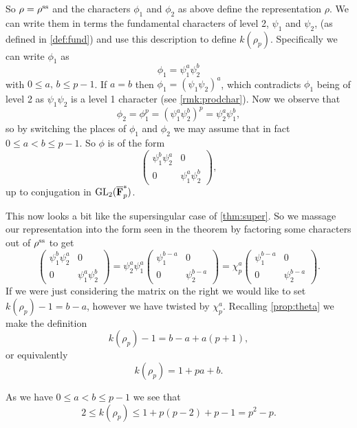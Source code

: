 \documentclass[a4paper,12pt]{article}
\begin{document}
So $\rho = \rho^\text{ss}$ and the characters $\phi_1$ and $\phi_2$ as above define the representation $\rho$.
We can write them in terms the fundamental characters of level 2, $\psi_1$ and $\psi_2$, (as defined in \cref{def:fund}) and use this description to define $k(\rho_p)$.
Specifically we can write $\phi_1$ as
\[
\phi_1 = \psi_1^a\psi_2^b
\]
with $0\le a,\,b\le p-1$.
If $a = b$ then $\phi_1 = (\psi_1 \psi_2)^a$, which contradicts $\phi_1$ being of level 2 as $\psi_1\psi_2$ is a level 1 character (see \cref{rmk:prodchar}).
Now we observe that
\[
\phi_2 = \phi_1^p = (\psi_1^a\psi_2^b)^p = \psi_2^a\psi_1^b,
\]
so by switching the places of $\phi_1$ and $\phi_2$ we may assume that in fact $0\le a < b\le p-1$.
So $\phi$ is of the form
\[
\begin{pmatrix}
\psi_1^b\psi_2^a & 0 \\
0                & \psi_1^a\psi_2^b
\end{pmatrix},
\]
up to conjugation in $\operatorname{GL}_2(\overline{\mathbf{F}}_p^*)$.

This now looks a bit like the supersingular case of \cref{thm:super}.
So we massage our representation into the form seen in the theorem by factoring some characters out of $\rho^\text{ss}$ to get
\[
\begin{pmatrix}
\psi_1^b\psi_2^a & 0 \\
0                & \psi_1^a\psi_2^b
\end{pmatrix} =
\psi_2^a\psi_1^a\begin{pmatrix}
\psi_1^{b-a} & 0 \\
0            & \psi_2^{b-a}
\end{pmatrix} =
\chi_p^a\begin{pmatrix}
\psi_1^{b-a} & 0 \\
0            & \psi_2^{b-a}
\end{pmatrix}.
\]
If we were just considering the matrix on the right we would like to set $k(\rho_p) - 1 = b - a$, however we have twisted by $\chi_p^a$.
Recalling \cref{prop:theta} we make the definition
\[
k(\rho_p) - 1 = b - a + a(p+1),
\]
or equivalently
\begin{equation}\label{eq:l2}
k(\rho_p) = 1 + pa + b.
\end{equation}

As we have $0 \le a< b \le p-1$ we see that
\[
2\le k(\rho_p) \le 1 + p(p-2) + p-1 = p^2-p.
\]
\end{document}
